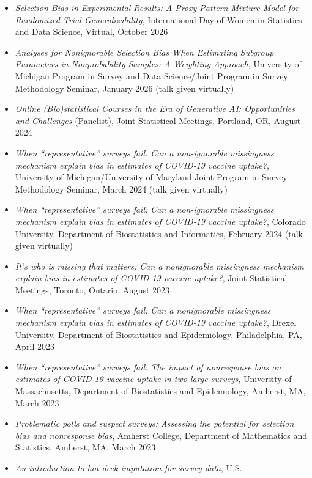 \documentclass[
  english,
  letterpaper,
  DIV=11,
  numbers=noendperiod]{scrartcl}
\providecommand{\tightlist}{%
  \setlength{\itemsep}{0pt}\setlength{\parskip}{0pt}}
\begin{document}
\begin{itemize}
\tightlist
\item
  \emph{Selection Bias in Experimental Results: A Proxy Pattern-Mixture
  Model for Randomized Trial Generalizability}, International Day of
  Women in Statistics and Data Science, Virtual, October 2026
\item
  \emph{Analyses for Nonignorable Selection Bias When Estimating
  Subgroup Parameters in Nonprobability Samples: A Weighting Approach},
  University of Michigan Program in Survey and Data Science/Joint
  Program in Survey Methodology Seminar, January 2026 (talk given
  virtually)
\item
  \emph{Online (Bio)statistical Courses in the Era of Generative AI:
  Opportunities and Challenges} (Panelist), Joint Statistical Meetings,
  Portland, OR, August 2024
\item
  \emph{When ``representative'' surveys fail: Can a non-ignorable
  missingness mechanism explain bias in estimates of COVID-19 vaccine
  uptake?}, University of Michigan/University of Maryland Joint Program
  in Survey Methodology Seminar, March 2024 (talk given virtually)
\item
  \emph{When ``representative'' surveys fail: Can a non-ignorable
  missingness mechanism explain bias in estimates of COVID-19 vaccine
  uptake?}, Colorado University, Department of Biostatistics and
  Informatics, February 2024 (talk given virtually)
\item
  \emph{It's who is missing that matters: Can a nonignorable missingness
  mechanism explain bias in estimates of COVID-19 vaccine uptake?},
  Joint Statistical Meetings, Toronto, Ontario, August 2023
\item
  \emph{When ``representative'' surveys fail: Can a nonignorable
  missingness mechanism explain bias in estimates of COVID-19 vaccine
  uptake?}, Drexel University, Department of Biostatistics and
  Epidemiology, Philadelphia, PA, April 2023
\item
  \emph{When ``representative'' surveys fail: The impact of nonresponse
  bias on estimates of COVID-19 vaccine uptake in two large surveys},
  University of Massachusetts, Department of Biostatistics and
  Epidemiology, Amherst, MA, March 2023
\item
  \emph{Problematic polls and suspect surveys: Assessing the potential
  for selection bias and nonresponse bias}, Amherst College, Department
  of Mathematics and Statistics, Amherst, MA, March 2023
\item
  \emph{An introduction to hot deck imputation for survey data}, U.S.

\end{itemize}
\end{document}
